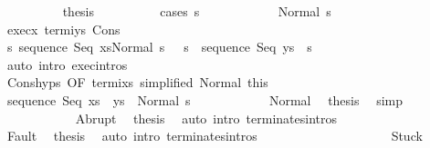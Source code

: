 \begin{isabellebody}
\ \ \ \ \ \ \ \ \isamarkupfalse%
\ {\isacharquery}thesis\isanewline
\ \ \ \ \ \ \ \ \isamarkupfalse%
\ {\isacharparenleft}cases\ s{\isacharprime}{\isacharparenright}\isanewline
\ \ \ \ \ \ \ \ \ \ \isamarkupfalse%
\ {\isacharparenleft}Normal\ s{\isacharprime}{\isacharprime}{\isacharparenright}\isanewline
\ \ \ \ \ \ \ \ \ \ \isamarkupfalse%
\ exec{\isacharunderscore}x\ termi{\isacharunderscore}ys\ Cons\ \isanewline
\ \ \ \ \ \ \ \ \ \ \isamarkupfalse%
\ {\isachardoublequoteopen}{\isasymforall}s{\isacharprime}{\isachardot}\ {\isasymGamma}{\isasymturnstile}{\isasymlangle}sequence\ Seq\ xs{\isacharcomma}Normal\ s{\isacharprime}{\isacharprime}\ {\isasymrangle}\ {\isasymRightarrow}\ s{\isacharprime}\ {\isasymlongrightarrow}\ {\isasymGamma}{\isasymturnstile}sequence\ Seq\ ys\ {\isasymdown}\ s{\isacharprime}{\isachardoublequoteclose}\isanewline
\ \ \ \ \ \ \ \ \ \ \ \ \isamarkupfalse%
\ {\isacharparenleft}auto\ intro{\isacharcolon}\ exec{\isachardot}intros{\isacharparenright}\isanewline
\ \ \ \ \ \ \ \ \ \ \isamarkupfalse%
\ Cons{\isachardot}hyps\ {\isacharbrackleft}OF\ termi{\isacharunderscore}xs\ {\isacharbrackleft}simplified\ Normal{\isacharbrackright}\ this{\isacharbrackright}\isanewline
\ \ \ \ \ \ \ \ \ \ \isamarkupfalse%
\ {\isachardoublequoteopen}{\isasymGamma}{\isasymturnstile}sequence\ Seq\ {\isacharparenleft}xs\ {\isacharat}\ ys{\isacharparenright}\ {\isasymdown}\ Normal\ s{\isacharprime}{\isacharprime}{\isachardoublequoteclose}\isacommand{{\isachardot}}\isamarkupfalse%
\isanewline
\ \ \ \ \ \ \ \ \ \ \isamarkupfalse%
\ Normal\ \isamarkupfalse%
\ {\isacharquery}thesis\ \isamarkupfalse%
\ simp\isanewline
\ \ \ \ \ \ \ \ \isamarkupfalse%
\isanewline
\ \ \ \ \ \ \ \ \ \ \isamarkupfalse%
\ Abrupt\ \isamarkupfalse%
\ {\isacharquery}thesis\ \isamarkupfalse%
\ {\isacharparenleft}auto\ intro{\isacharcolon}\ terminates{\isachardot}intros{\isacharparenright}\isanewline
\ \ \ \ \ \ \ \ \isamarkupfalse%
\isanewline
\ \ \ \ \ \ \ \ \ \ \isamarkupfalse%
\ Fault\ \isamarkupfalse%
\ {\isacharquery}thesis\ \isamarkupfalse%
\ {\isacharparenleft}auto\ intro{\isacharcolon}\ terminates{\isachardot}intros{\isacharparenright}\isanewline
\ \ \ \ \ \ \ \ \isamarkupfalse%
\isanewline
\ \ \ \ \ \ \ \ \ \ \isamarkupfalse%
\ Stuck\ \isamarkupfalse%

\end{isabellebody}

